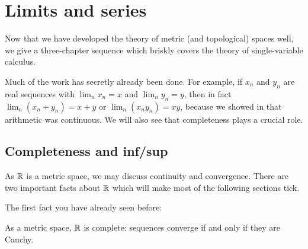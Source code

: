 \chapter{Limits and series}
\label{ch:calc_limits}
Now that we have developed the theory
of metric (and topological) spaces well,
we give a three-chapter sequence which
briskly covers the theory of single-variable calculus.

Much of the work has secretly already been done.
For example, if $x_n$ and $y_n$ are real sequences
with $\lim_n x_n = x$ and $\lim_n y_n = y$,
then in fact $\lim_n (x_n + y_n) = x+y$
or $\lim_n (x_n y_n) = xy$,
because we showed in 
that arithmetic was continuous.
We will also see that completeness plays a crucial role.

\section{Completeness and inf/sup}
As $\RR$ is a metric space,
we may discuss continuity and convergence.
There are two important facts about $\RR$
which will make most of the following sections tick.

The first fact you have already seen before:
\begin{theorem}
	[$\RR$ is complete]
	\label{thm:complete_R}
	As a metric space, $\RR$ is complete:
	sequences converge if and only if they are Cauchy.
\end{theorem}

